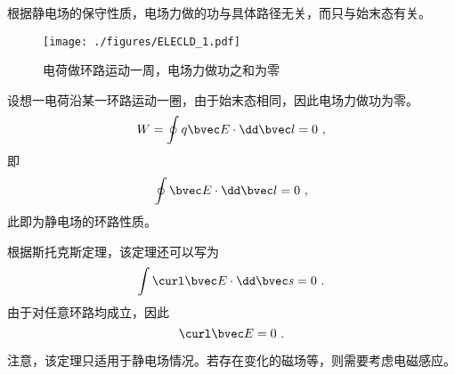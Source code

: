 

根据静电场的保守性质，电场力做的功与具体路径无关，而只与始末态有关。
\begin{figure}[ht]
\centering
\texttt{[image: ./figures/ELECLD\_1.pdf]}
\caption{电荷做环路运动一周，电场力做功之和为零} \label{ELECLD_fig1}
\end{figure}

设想一电荷沿某一环路运动一圈，由于始末态相同，因此电场力做功为零。
$$
W = \oint q\bvec E \cdot \dd \bvec l = 0~,
$$
即
\begin{equation}
\oint \bvec E \cdot \dd \bvec l = 0~,
\end{equation}
此即为静电场的环路性质。

根据斯托克斯定理，该定理还可以写为
$$\int \curl \bvec E \cdot \dd \bvec s = 0~.$$
由于对任意环路均成立，因此
\begin{equation}
\curl \bvec E = 0~.
\end{equation}

注意，该定理只适用于静电场情况。若存在变化的磁场等，则需要考虑电磁感应。